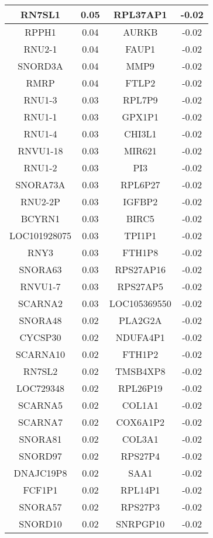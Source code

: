 \begin{longtable}{|c|c||c|c|}
		RN7SL1 & 0.05 & RPL37AP1 & -0.02 \\
		\hline
		RPPH1 & 0.04 & AURKB & -0.02 \\
		\hline
		RNU2-1 & 0.04 & FAUP1 & -0.02 \\
		\hline
		SNORD3A & 0.04 & MMP9 & -0.02 \\
		\hline
		RMRP & 0.04 & FTLP2 & -0.02 \\
		\hline
		RNU1-3 & 0.03 & RPL7P9 & -0.02 \\
		\hline
		RNU1-1 & 0.03 & GPX1P1 & -0.02 \\
		\hline
		RNU1-4 & 0.03 & CHI3L1 & -0.02 \\
		\hline
		RNVU1-18 & 0.03 & MIR621 & -0.02 \\
		\hline
		RNU1-2 & 0.03 & PI3 & -0.02 \\
		\hline
		SNORA73A & 0.03 & RPL6P27 & -0.02 \\
		\hline
		RNU2-2P & 0.03 & IGFBP2 & -0.02 \\
		\hline
		BCYRN1 & 0.03 & BIRC5 & -0.02 \\
		\hline
		LOC101928075 & 0.03 & TPI1P1 & -0.02 \\
		\hline
		RNY3 & 0.03 & FTH1P8 & -0.02 \\
		\hline
		SNORA63 & 0.03 & RPS27AP16 & -0.02 \\
		\hline
		RNVU1-7 & 0.03 & RPS27AP5 & -0.02 \\
		\hline
		SCARNA2 & 0.03 & LOC105369550 & -0.02 \\
		\hline
		SNORA48 & 0.02 & PLA2G2A & -0.02 \\
		\hline
		CYCSP30 & 0.02 & NDUFA4P1 & -0.02 \\
		\hline
		SCARNA10 & 0.02 & FTH1P2 & -0.02 \\
		\hline
		RN7SL2 & 0.02 & TMSB4XP8 & -0.02 \\
		\hline
		LOC729348 & 0.02 & RPL26P19 & -0.02 \\
		\hline
		SCARNA5 & 0.02 & COL1A1 & -0.02 \\
		\hline
		SCARNA7 & 0.02 & COX6A1P2 & -0.02 \\
		\hline
		SNORA81 & 0.02 & COL3A1 & -0.02 \\
		\hline
		SNORD97 & 0.02 & RPS27P4 & -0.02 \\
		\hline
		DNAJC19P8 & 0.02 & SAA1 & -0.02 \\
		\hline
		FCF1P1 & 0.02 & RPL14P1 & -0.02 \\
		\hline
		SNORA57 & 0.02 & RPS27P3 & -0.02 \\
		\hline
		SNORD10 & 0.02 & SNRPGP10 & -0.02 \\

\end{longtable}
